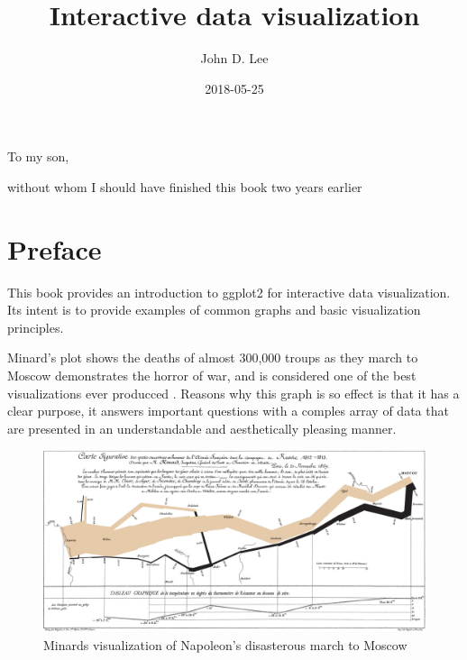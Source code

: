\documentclass[]{krantz}
\title{Interactive data visualization}
\author{John D. Lee}
\date{2018-05-25}
\theoremstyle{definition}
\theoremstyle{definition}
\theoremstyle{definition}
\theoremstyle{remark}
\begin{document}
\maketitle


\thispagestyle{empty}

\begin{center}
To my son,

without whom I should have finished this book two years earlier
\end{center}

\setlength{\abovedisplayskip}{-5pt}
\setlength{\abovedisplayshortskip}{-5pt}

{
\hypersetup{linkcolor=black}
\setcounter{tocdepth}{2}
\tableofcontents
}
\listoftables
\listoffigures
\chapter*{Preface}\label{preface}


This book provides an introduction to ggplot2 for interactive data
visualization. Its intent is to provide examples of common graphs and
basic visualization principles.

Minard's plot shows the deaths of almost 300,000 troups as they march to
Moscow demonstrates the horror of war, and is considered one of the best
visualizations ever producced \citep{Tufte1983}. Reasons why this graph
is so effect is that it has a clear purpose, it answers important
questions with a comples array of data that are presented in an
understandable and aesthetically pleasing manner.

\begin{figure}
\includegraphics[width=27.82in]{images/Minard_timeline_map} \caption{Minards visualization of Napoleon's disasterous march to Moscow}\label{fig:minard}
\end{figure}
\end{document}
